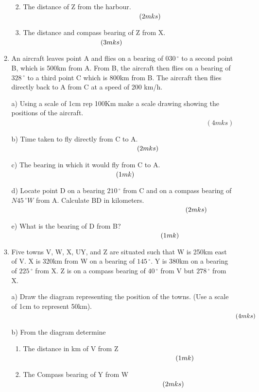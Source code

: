 \documentclass[
  a4paperpaper,
]{scrbook}
\begin{document}
\begin{enumerate}
\begin{tcolorbox}
\begin{enumerate}
    \begin{enumerate}
    \def\labelenumiii{\roman{enumiii})}
    \setcounter{enumiii}{1}
    \item
      The distance of Z from the harbour. \(\hspace{6.0cm} (2mks)\)
    \item
      The distance and compass bearing of Z from X.
      \(\hspace{4.0cm} (3mks)\)
    \end{enumerate}
  \item
    An aircraft leaves point A and flies on a bearing of
    \(030\,^{\circ}\) to a second point B, which is 500km from A. From
    B, the aircraft then flies on a bearing of \(328\,^{\circ}\) to a
    third point C which is 800km from B. The aircraft then flies
    directly back to A from C at a speed of 200 km/h.

    a) Using a scale of 1cm rep 100Km make a scale drawing showing the
    positions of the aircraft. \(\hspace{12cm} (4mks)\)

    b) Time taken to fly directly from C to A. \(\hspace{6.5cm} (2mks)\)

    c) The bearing in which it would fly from C to A.
    \(\hspace{5.4cm} (1mk)\)

    d) Locate point D on a bearing \(210\,^{\circ}\) from C and on a
    compass bearing of \(N45\,^{\circ}W\) from A. Calculate BD in
    kilometers. \(\hspace{9.0cm} (2mks)\)

    e) What is the bearing of D from B? \(\hspace{7.7cm} (1mk)\)
  \item
    Five towns V, W, X, UY, and Z are situated such that W is 250km east
    of V. X is 320km from W on a bearing of \(145\,^{\circ}\). Y is
    380km on a bearing of \(225\,^{\circ}\) from X. Z is on a compass
    bearing of \(40\,^{\circ}\) from V but \(278\,^{\circ}\) from X.

    a) Draw the diagram representing the position of the towns. (Use a
    scale of 1cm to represent 50km). \(\hspace{12.5cm} (4mks)\)

    b) From the diagram determine

    \begin{enumerate}
    \def\labelenumiii{\roman{enumiii})}
    \item
      The distance in km of V from Z \(\hspace{7.9cm} (1mk)\)
    \item
      The Compass bearing of Y from W \(\hspace{7.2cm} (2mks)\)
    \end{enumerate}


\end{enumerate}
\end{tcolorbox}
\end{enumerate}
\end{document}
